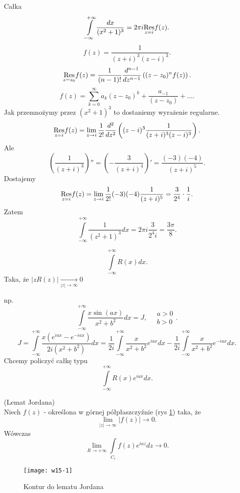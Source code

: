 \documentclass[../main.tex]{subfiles}
\begin{document}
\begin{przyklad}
    Całka
    \[
        \int\limits_{-\infty}^{+\infty} \frac{dx}{(x^{2}+1)^{3}} = 2 \pi i \underset{z = i}{\operatorname{Res}}f(z)
    .\]
\[
    f(z) = \frac{1}{(z+i)^3(z-i)^3}
.\]
\[
    \underset{z = z_0}{\operatorname{Res}} f(z) = \frac{1}{(n-1)!} \frac{d^{n-1}}{dz^{n-1}}\left( (z - z_0)^n f(z) \right)
.\]
\[
    f(z) = \sum_{k = 0}^{\infty} a_k(z-z_0)^k + \frac{a_{-1}}{(z-z_0)} + \ldots
.\]
Jak przemnożymy przez $(x^2 + 1)^3$ to dostaniemy wyrażenie regularne.
\[
    \underset{z = i}{\operatorname{Res}} f(z) = \lim\limits_{z \to i} \frac{1}{2!} \frac{d^2}{dz^2}\left( (z-i)^3 \frac{1}{(z+i)^3(z-i)^3} \right)
.\]
Ale
\[
    \left( \frac{1}{(z+i)^3} \right)'' = \left( -\frac{3}{(z+i)^4} \right)' = \frac{(-3)(-4)}{(z+i)^5}
.\]
Dostajemy
\[
    \underset{z = i}{\operatorname{Res}} f(z) = \lim\limits_{z\to i} \frac{1}{2!} (-3)(-4) \frac{1}{(z+i)^5} = \frac{3}{2^4} \cdot \frac{1}{i}
.\]
Zatem
\[
    \int\limits_{-\infty}^{+\infty} \frac{1}{(z^2 + 1)^3}dx = 2\pi i \frac{3}{2^4 i} = \frac{3\pi}{8}
.\]
\end{przyklad}
\begin{przyklad}
    \[
        \int\limits_{-\infty}^{+\infty}R(x) dx
    .\]
Taka, że $\left| z R(z)\right| \underset{|z|\to \infty}{\longrightarrow} 0 $

np.
\[
    \int\limits_{-\infty}^{+\infty} \frac{x \sin(ax)}{x^2 + b^2}dx = J,\quad \begin{matrix}a > 0\\ b > 0\end{matrix}
.\]
\[
    J = \int\limits_{-\infty}^{+\infty}\frac{x\left( e^{iax} - e^{-iax} \right) }{2i (x^2 + b^2)}dx = \frac{1}{2i}\int\limits_{-\infty}^{+\infty} \frac{x}{x^2 + b^2}e^{iax}dx - \frac{1}{2i}\int\limits_{-\infty}^{+\infty} \frac{x}{x^2 + b^2}e^{-iax}dx
.\]
Chcemy policzyć całkę typu
\[
    \int\limits_{-\infty}^{+\infty}R(x)e^{iax}dx
.\]
\end{przyklad}
\begin{tw}
    (Lemat Jordana)\\
    Niech $f(z)$ - określona w górnej półpłaszczyźnie (rys \ref{fig:w15-1}) taka, że
    \[
        \lim\limits_{|z|\to \infty}|f(z)| \to 0
    .\]
Wówczas
\[
    \lim\limits_{R\to +\infty} \int\limits_{C_r} f(z)e^{iaz}dz\to 0
.\]
\end{tw}
\begin{figure}[h]
    \centering
    \texttt{[image: w15-1]}
    \caption{Kontur do lematu Jordana}
    \label{fig:w15-1}
\end{figure}
\end{document}
